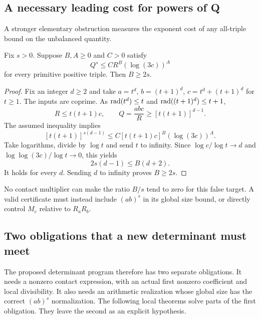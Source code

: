 \subsection{A necessary leading cost for powers of Q}
A stronger elementary obstruction measures the exponent cost of any all-triple bound on the unbalanced quantity.
\begin{theorem}\label{thm:necessary-cost}
Fix $s>0$. Suppose $B,A\ge0$ and $C>0$ satisfy
\[
 Q^s\le C R^B(\log(3c))^A
\]
for every primitive positive triple. Then $B\ge2s$.
\end{theorem}
\begin{proof}
Fix an integer $d\ge2$ and take $a=t^d$, $b=(t+1)^d$, $c=t^d+(t+1)^d$ for $t\ge1$. The inputs are coprime. As $\operatorname{rad}(t^d)\le t$ and $\operatorname{rad}((t+1)^d)\le t+1$,
\[
 R\le t(t+1)c,\qquad
 Q=\frac{abc}{R}\ge[t(t+1)]^{d-1}.
\]
The assumed inequality implies
\[
 [t(t+1)]^{s(d-1)}\le C[t(t+1)c]^B(\log(3c))^A.
\]
Take logarithms, divide by $\log t$ and send $t$ to infinity. Since $\log c/\log t\to d$ and $\log\log(3c)/\log t\to0$, this yields
\[
 2s(d-1)\le B(d+2).
\]
It holds for every $d$. Sending $d$ to infinity proves $B\ge2s$.
\end{proof}
No contact multiplier can make the ratio $B/s$ tend to zero for this false target. A valid certificate must instead include $(ab)^s$ in its global size bound, or directly control $M_c$ relative to $R_aR_b$.


\subsection{Two obligations that a new determinant must meet}
The proposed determinant program therefore has two separate obligations. It needs a nonzero contact expression, with an actual first nonzero coefficient and local divisibility. It also needs an arithmetic realization whose global size has the correct $(ab)^s$ normalization. The following local theorems solve parts of the first obligation. They leave the second as an explicit hypothesis.
